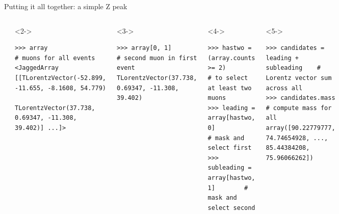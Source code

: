 \documentclass[aspectratio=169]{beamer}
\begin{document}
\begin{frame}[fragile]{Putting it all together: a simple Z peak}
\small
\vspace{0.1 cm}
\begin{columns}
\begin{verbatim}
>>> import uproot
>>> dataset = uproot.open("HZZ-objects.root")["events"]
>>> array = dataset.array("muonp4")
\end{verbatim}

\begin{uncoverenv}<2->
\begin{verbatim}
>>> array                                # muons for all events
<JaggedArray [[TLorentzVector(-52.899, -11.655, -8.1608, 54.779)
               TLorentzVector(37.738, 0.69347, -11.308, 39.402)] ...]>
\end{verbatim}
\end{uncoverenv}

\begin{uncoverenv}<3->
\begin{verbatim}
>>> array[0, 1]                          # second muon in first event
TLorentzVector(37.738, 0.69347, -11.308, 39.402)
\end{verbatim}
\end{uncoverenv}

\begin{uncoverenv}<4->
\begin{verbatim}
>>> hastwo = (array.counts >= 2)         # to select at least two muons
>>> leading = array[hastwo, 0]           # mask and select first
>>> subleading = array[hastwo, 1]        # mask and select second
\end{verbatim}
\end{uncoverenv}

\begin{uncoverenv}<5->
\begin{verbatim}
>>> candidates = leading + subleading    # Lorentz vector sum across all
>>> candidates.mass                      # compute mass for all
array([90.22779777, 74.74654928, ..., 85.44384208, 75.96066262])
\end{verbatim}
\end{uncoverenv}
\end{columns}
\end{frame}
\end{document}
